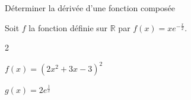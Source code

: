     \begin{bmethodet}{Déterminer la dérivée d'une fonction composée	}
    	
    	Soit $f$ la fonction définie sur $\mathbb{R}$ par $f(x)=x e^{-\frac{x}{2}}$.
    	\begin{multicols}{2}
    		\begin{enumMet}
    			\item $f(x)=\left(2 x^2+3 x-3\right)^2$
    			\item $g(x)=2 e^{\frac{1}{x}}$
    		\end{enumMet}
    	\end{multicols}
    	
    	
    	\begin{enumMet}
    		\item {}\pointilles[\textwidth-0.5cm]
    		
    		\pointilles[\textwidth-0.5cm]
    		
    		\pointilles[\textwidth-0.5cm]
    		
    		\pointilles[\textwidth-0.5cm]
    		
    		\item {}\pointilles[\textwidth-0.5cm]
    		
    		\pointilles[\textwidth-0.5cm]
    		
    		\pointilles[\textwidth-0.5cm]
    		
    		\pointilles[\textwidth-0.5cm]
    	\end{enumMet}
    \end{bmethodet}
    
